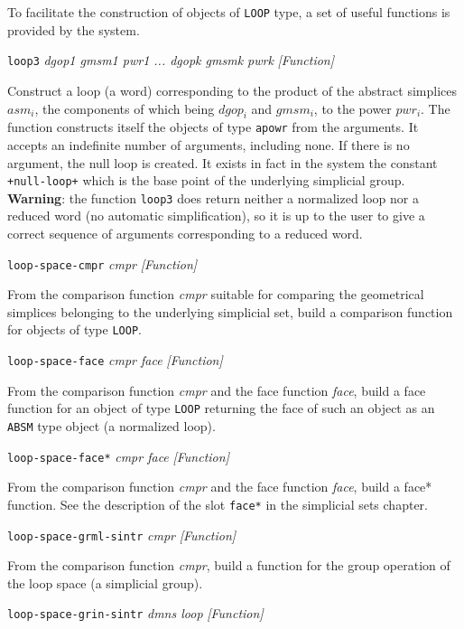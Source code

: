 To facilitate the construction of objects of {\tt LOOP} type,
a set of useful functions is provided by the system.
\vskip 0.50cm
{\parindent=0mm
{\leftskip=5mm
{\tt loop3} {\em dgop1 gmsm1 pwr1 ... dgopk gmsmk pwrk} \hfill {\em [Function]} \par}
{\leftskip=15mm
Construct a  loop (a word) corresponding to the product of the abstract simplices $asm_i$, the components
of which being $dgop_i$ and $gmsm_i$,  to
the power $pwr_i$. The function constructs  itself the  objects of type {\tt apowr}  from the arguments.
It  accepts an indefinite number of arguments, including none.
If there is no argument, the null loop is created. It exists in fact in the system
the constant {\tt +null-loop+} which is  the base point of the underlying simplicial group.
{\bf Warning}: the function {\tt loop3} does
return neither a normalized loop nor a reduced word (no automatic simplification),
so it is up to the user to give a correct sequence of arguments
cor\-res\-pon\-ding to  a reduced word.
\par}
{\leftskip=5mm
{\tt loop-space-cmpr} {\em cmpr} \hfill {\em [Function]}  \par}
{\leftskip=15mm
From the comparison function {\em cmpr} suitable for comparing the geometrical simplices belonging to the
underlying simplicial set, build a comparison function for objects of type {\tt LOOP}. \par}
{\leftskip=5mm
{\tt loop-space-face} {\em cmpr face} \hfill {\em [Function]}  \par}
{\leftskip=15mm
From the comparison function {\em cmpr} and the face function {\em face}, build a face function
for an object of type {\tt LOOP} returning the face of such an object  as an {\tt ABSM} type object
(a normalized loop). \par}
{\leftskip=5mm
{\tt loop-space-face*} {\em cmpr face} \hfill {\em [Function]}  \par}
{\leftskip=15mm
From the comparison function {\em cmpr} and the face function {\em face}, build a face* function.
See the description of the slot {\tt face*} in the simplicial sets chapter. \par}
{\leftskip=5mm
{\tt loop-space-grml-sintr} {\em cmpr} \hfill {\em [Function]}  \par}
{\leftskip=15mm
From the comparison function {\em cmpr}, build a function for the group operation of the loop space
(a simplicial group). \par}
{\leftskip=5mm
{\tt loop-space-grin-sintr} {\em dmns loop} \hfill {\em [Function]}  \par}
}
